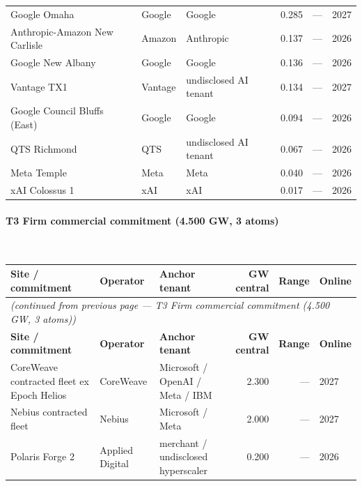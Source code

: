 \begin{small}
\begin{longtable}{@{}p{4.5cm} p{2.4cm} p{2.4cm} r r p{1.8cm}@{}}
Google Omaha & Google & Google & 0.285 & — & 2027 \\

Anthropic-Amazon New Carlisle & Amazon & Anthropic & 0.137 & — & 2026 \\

Google New Albany & Google & Google & 0.136 & — & 2026 \\

Vantage TX1 & Vantage & undisclosed AI tenant & 0.134 & — & 2027 \\

Google Council Bluffs (East) & Google & Google & 0.094 & — & 2026 \\

QTS Richmond & QTS & undisclosed AI tenant & 0.067 & — & 2026 \\

Meta Temple & Meta & Meta & 0.040 & — & 2026 \\

xAI Colossus 1 & xAI & xAI & 0.017 & — & 2026 \\

\end{longtable}\end{small}


\paragraph{\textbf{T3 Firm commercial commitment (4.500 GW, 3 atoms)}}~\\[0.3em]
\noindent\begin{small}
\begin{longtable}{@{}p{4.5cm} p{2.4cm} p{2.4cm} r r p{1.8cm}@{}}
\toprule
\textbf{Site / commitment} & \textbf{Operator} & \textbf{Anchor tenant} & \textbf{GW central} & \textbf{Range} & \textbf{Online} \\
\midrule
\endfirsthead
\multicolumn{6}{l}{\textit{(continued from previous page — T3 Firm commercial commitment (4.500 GW, 3 atoms))}} \\
\toprule
\textbf{Site / commitment} & \textbf{Operator} & \textbf{Anchor tenant} & \textbf{GW central} & \textbf{Range} & \textbf{Online} \\
\midrule
\endhead
\bottomrule
\endfoot

CoreWeave contracted fleet ex Epoch Helios & CoreWeave & Microsoft / OpenAI / Meta / IBM & 2.300 & — & 2027 \\

Nebius contracted fleet & Nebius & Microsoft / Meta & 2.000 & — & 2027 \\

Polaris Forge 2 & Applied Digital & merchant / undisclosed hyperscaler & 0.200 & — & 2026 \\

\end{longtable}\end{small}


